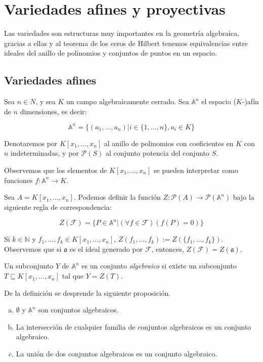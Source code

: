 \section{Variedades afines y proyectivas}

Las variedades son estructuras muy importantes en la geometría algebraica, gracias a ellas y al teorema de los ceros de Hilbert tenemos equivalencias entre ideales del anillo de polinomios y conjuntos de puntos en un espacio.

\subsection{Variedades afines}

Sea $n \in N$, y sea $K$ un campo algebraicamente cerrado. Sea $\mathbb{A}^n$ el espacio ($K$-)afín de $n$ dimensiones, es decir:

$$\mathbb{A}^n = \{(a_1, \dots, a_n)|i \in \{1, \dots, n\}, a_i \in K\}$$

Denotaremos por $K[x_1,\dots,x_n]$ al anillo de polinomios con coeficientes en $K$ con $n$ indeterminadas, y por $\mathcal{P}(S)$ al conjunto potencia del conjunto $S$.

Observemos que los elementos de $K[x_1,\dots, x_n]$ se pueden interpretar como funciones $f:\mathbb{A}^n \rightarrow K$.

\begin{definition}
Sea $A = K[x_1,\dots,x_n]$. Podemos definir la función $Z:\mathcal{P}(A) \rightarrow \mathcal{P}(\mathbb{A}^n)$ bajo la siguiente regla de correspondencia:

$$ Z(\mathscr{F}) = \{P \in \mathbb{A}^n | (\forall f \in \mathscr{F})( f(P) = 0) \} $$

Si $k\in \mathbb{N}$ y $f_1,\dots,f_k \in K[x_1,\dots,x_n]$, $Z(f_1,\dots,f_k) := Z(\{f_1,\dots,f_k\})$. Observemos que si $\mathfrak{a}$ es el ideal generado por $\mathscr{F}$, entonces, $Z(\mathscr{F}) = Z(\mathfrak{a})$.
\end{definition}

\begin{definition}
Un subconjunto $Y$ de $\mathbb{A}^n$ es un conjunto \emph{algebraico} si existe un subconjunto $T \subseteq K[x_1, \dots, x_n]$ tal que $Y = Z(T)$.
\end{definition}

De la definición se desprende la siguiente proposición.

\begin{proposition}\label{zariski topology}
\begin{enumerate}[(a)]
\item $\emptyset$ y $\mathbb{A}^n$ son conjuntos algebraicos. 
\item La intersección de cualquier familia de conjuntos algebraicos es un conjunto algebraico.
\item La unión de dos conjuntos algebraicos es un conjunto algebraico.  
\end{enumerate}
\end{proposition}

